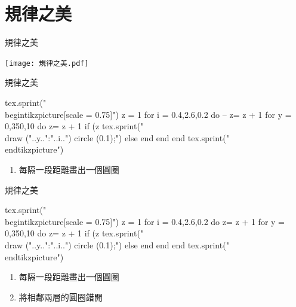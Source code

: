 \section{規律之美}
\begin{tcolorbox}
規律之美
\end{tcolorbox}
\begin{figbox}
\centering
\texttt{[image: 規律之美.pdf]}
\end{figbox}
\newpage
\begin{tcolorbox}
規律之美
\end{tcolorbox}
\begin{figbox}
\begin{multicols}{2}
\begin{luacode}
tex.sprint("\\begin{tikzpicture}[scale = 0.75]")
z = 1
for i = 0.4,2.6,0.2 do
-- z= z + 1
	for y = 0,350,10 do
	z= z + 1
		if (z%
			tex.sprint("\\draw ("..y..":"..i..") circle (0.1);")
		else
		end
	end
end
tex.sprint("\\end{tikzpicture}")
\end{luacode}
\columnbreak
\begin{Large}
\begin{enumerate}
\item 每隔一段距離畫出一個圓圈
\end{enumerate}
\end{Large}
\end{multicols}
\end{figbox}
\newpage
\begin{tcolorbox}
規律之美
\end{tcolorbox}
\begin{figbox}
\begin{multicols}{2}
\begin{luacode}
tex.sprint("\\begin{tikzpicture}[scale = 0.75]")
z = 1
for i = 0.4,2.6,0.2 do
z= z + 1
	for y = 0,350,10 do
	z= z + 1
		if (z%
			tex.sprint("\\draw ("..y..":"..i..") circle (0.1);")
		else
		end
	end
end
tex.sprint("\\end{tikzpicture}")
\end{luacode}
\columnbreak
\begin{Large}
\begin{enumerate}
\item 每隔一段距離畫出一個圓圈
\item 將相鄰兩層的圓圈錯開
\end{enumerate}
\end{Large}
\end{multicols}
\end{figbox}
\newpage
